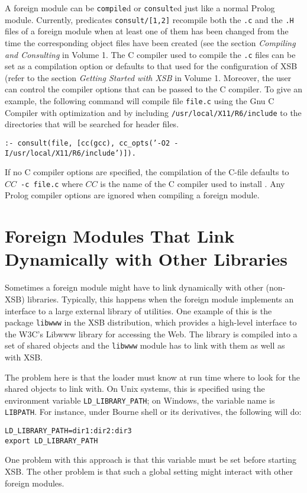 A foreign module can be {\tt compile}d or {\tt consult}ed just like a
normal Prolog module.  Currently, predicates {\tt consult/[1,2]}
recompile both the {\tt *.c} and the {\tt *.H} files of a foreign
module when at least one of them has been changed from the time the
corresponding object files have been created (see the section {\it
Compiling and Consulting} in Volume 1. 
The C compiler used to compile the {\tt *.c} files can be set as a
compilation option or defaults to that used for the configuration of
XSB (refer to the section {\it Getting Started with XSB} in Volume 1.
Moreover, the user can control the compiler options that can be passed
to the C compiler.  To give an example, the following command will
compile file {\tt file.c} using the Gnu C Compiler with optimization
and by including {\tt /usr/local/X11/R6/include} to the directories that
will be searched for header files.
\begin{center}
{\tt  :- consult(file,
                 [cc(gcc), cc\_opts('-O2 -I/usr/local/X11/R6/include')]). }
\end{center}
If no C compiler options are specified, the compilation of the C-file
defaults to $CC$~{\tt -c~file.c} where $CC$ is the name of the C compiler
used to install \ourprolog.
Any Prolog compiler options are ignored when compiling a foreign module.

\section{Foreign Modules That Link Dynamically with Other Libraries}

Sometimes a foreign module might have to link dynamically with other
(non-XSB) libraries. Typically, this happens when the foreign module
implements an interface to a large external library of utilities.
One example of this is the package {\tt libwww} in the XSB distribution,
which provides a high-level interface to the W3C's Libwww library for
accessing the Web. The library is compiled into a set of shared objects and
the {\tt libwww} module has to link with them as well as with XSB.

The problem here is that the loader must know at run time where to look for
the shared objects to link with. On Unix systems, this is specified using
the environment variable {\tt LD\_LIBRARY\_PATH}; on Windows, the variable
name is {\tt LIBPATH}. For instance, 
under Bourne shell or its derivatives, the following will do:
\begin{verbatim}
LD_LIBRARY_PATH=dir1:dir2:dir3
export LD_LIBRARY_PATH
\end{verbatim}
One problem with this approach is that this variable must be set before
starting XSB. The other problem is that such a global setting might
interact with other foreign modules.

